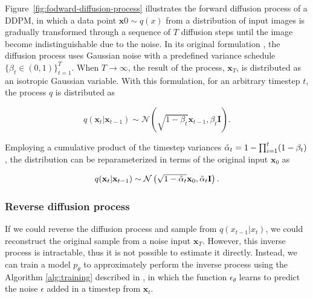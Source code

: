 Figure~\ref{fig:fodward-diffusion-process} illustrates the forward diffusion process of a DDPM, in which a data point $\textbf{x}0 \sim q(x)$ from a distribution of input images is gradually transformed through a sequence of $T$ diffusion steps until the image become indistinguishable due to the noise. In its original formulation \cite{HoEtAl2020}, the diffusion process uses Gaussian noise with a predefined variance schedule $\{\beta_t \in (0, 1)\}_{t=1}^T$. When $T \rightarrow \infty$, the result of the process, $\textbf{x}_T$, is distributed as an isotropic Gaussian variable. With this formulation, for an arbitrary timestep $t$, the process $q$ is distributed as


\begin{equation}
    q(\textbf{x}_t |\textbf{x}_{t-1}) \sim \mathcal{N}\left(\sqrt{1 - \beta_t}\textbf{x}_{t-1}, \beta_t \textbf{I}\right).
\end{equation}

Employing a cumulative product of the timestep variances $\Tilde{\alpha}_t = 1 - \prod_{i=1}^t (1 - \beta_t)$, the distribution can be reparameterized in terms of the original input $\textbf{x}_0$ as


\begin{equation}
    q(\textbf{x}_t |\textbf{x}_{t-1}) \sim \mathcal{N}\left(\sqrt{1 - \Tilde{\alpha}_t}\textbf{x}_0,  \Tilde{\alpha}_t \textbf{I}\right).
\end{equation}

\subsubsection{Reverse diffusion process}
 
If we could reverse the diffusion process and sample from $q(x_{t-1}|x_t)$, we could reconstruct the original sample from a noise input $\textbf{x}_T$. However, this inverse process is intractable, thus it is not possible to estimate it directly. Instead, we can train a model $p_\theta$ to approximately perform the inverse process using the Algorithm \ref{alg:training} described in \cite{HoEtAl2020}, in which the function $\epsilon_{\theta}$ learns to predict the noise $\epsilon$ added in a timestep from $\textbf{x}_t$.


